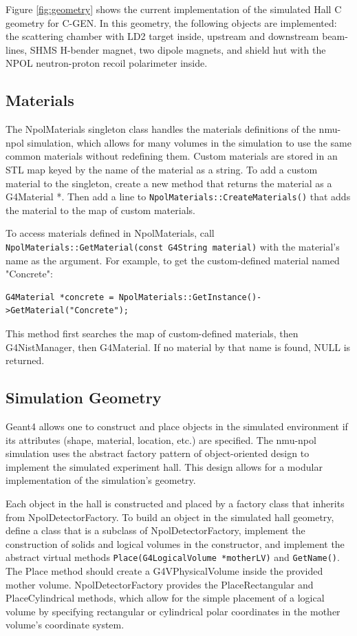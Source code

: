\documentclass[10pt,titlepage]{article}
\begin{document}
Figure \ref{fig:geometry} shows the current implementation of the simulated Hall C geometry for C-GEN.  In this geometry, the following objects are implemented: the scattering chamber with LD2 target inside, upstream and downstream beam-lines, SHMS H-bender magnet, two dipole magnets, and shield hut with the NPOL neutron-proton recoil polarimeter inside.

\subsection{Materials}

The NpolMaterials singleton class handles the materials definitions of the nmu-npol simulation, which allows for many volumes in the simulation to use the same common materials without redefining them. Custom materials are stored in an STL map keyed by the name of the material as a string.  To add a custom material to the singleton, create a new method that returns the material as a G4Material *.  Then add a line to \texttt{NpolMaterials::CreateMaterials()} that adds the material to the map of custom materials.

To access materials defined in NpolMaterials, call \texttt{NpolMaterials::GetMaterial(const G4String material)} with the material's name as the argument.  For example, to get the custom-defined material named "Concrete":
\begin{lstlisting}
G4Material *concrete = NpolMaterials::GetInstance()->GetMaterial("Concrete");
\end{lstlisting}
This method first searches the map of custom-defined materials, then G4NistManager, then G4Material.  If no material by that name is found, NULL is returned.  

\subsection{Simulation Geometry}

Geant4 allows one to construct and place objects in the simulated environment if its attributes (shape, material, location, etc.) are specified.  The nmu-npol simulation uses the abstract factory pattern of object-oriented design to implement the simulated experiment hall.  This design allows for a modular implementation of the simulation's geometry. 

Each object in the hall is constructed and placed by a factory class that inherits from NpolDetectorFactory.  To build an object in the simulated hall geometry, define a class that is a subclass of NpolDetectorFactory, implement the construction of solids and logical volumes in the constructor, and implement the abstract virtual methods \texttt{Place(G4LogicalVolume *motherLV)} and \texttt{GetName()}.  The Place method should create a G4VPhysicalVolume inside the provided mother volume.  NpolDetectorFactory provides the PlaceRectangular and PlaceCylindrical methods, which allow for the simple placement of a logical volume by specifying rectangular or cylindrical polar coordinates in the mother volume's coordinate system.
\end{document}
